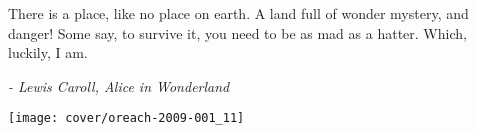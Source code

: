 \cleardoublepage


\thispagestyle{empty}
\newpage
\null
\vfill
%

%		
\epigraph{There is a place, like no place on earth. 
	A land full of wonder mystery, and danger! 
	Some say, to survive it, you need to be as mad as a hatter. 
	Which, luckily,
	 I am.}{\textit{- Lewis Caroll, Alice in Wonderland}}
 \vspace*{30mm}
\begin{figure*}[tbph]
	\centering
	\texttt{[image: cover/oreach-2009-001\_11]}
\end{figure*}

\vfill